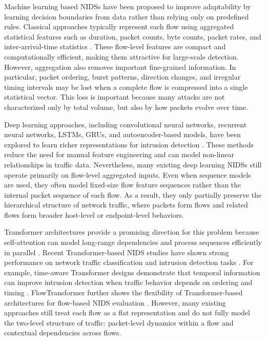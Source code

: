 \documentclass[11pt,fleqn]{report}
\begin{document}
Machine learning based NIDSs have been proposed to improve adaptability by learning decision boundaries from data rather than relying only on predefined rules. Classical approaches typically represent each flow using aggregated statistical features such as duration, packet counts, byte counts, packet rates, and inter-arrival-time statistics \cite{BuczakGuven2016,Ahmed2016Survey}. These flow-level features are compact and computationally efficient, making them attractive for large-scale detection. However, aggregation also removes important fine-grained information. In particular, packet ordering, burst patterns, direction changes, and irregular timing intervals may be lost when a complete flow is compressed into a single statistical vector. This loss is important because many attacks are not characterized only by total volume, but also by how packets evolve over time.

Deep learning approaches, including convolutional neural networks, recurrent neural networks, LSTMs, GRUs, and autoencoder-based models, have been explored to learn richer representations for intrusion detection \cite{Yin2017RNNIDS,Shone2018NNAE,Mirsky2018Kitsune}. These methods reduce the need for manual feature engineering and can model non-linear relationships in traffic data. Nevertheless, many existing deep learning NIDSs still operate primarily on flow-level aggregated inputs. Even when sequence models are used, they often model fixed-size flow feature sequences rather than the internal packet sequence of each flow. As a result, they only partially preserve the hierarchical structure of network traffic, where packets form flows and related flows form broader host-level or endpoint-level behaviors.

Transformer architectures provide a promising direction for this problem because self-attention can model long-range dependencies and process sequences efficiently in parallel \cite{Vaswani2017}. Recent Transformer-based NIDS studies have shown strong performance on network traffic classification and intrusion detection tasks \cite{Wu2022RTIDS,Han2023GTID,Manocchio2024FlowTransformer}. For example, time-aware Transformer designs demonstrate that temporal information can improve intrusion detection when traffic behavior depends on ordering and timing \cite{Han2023GTID}. FlowTransformer further shows the flexibility of Transformer-based architectures for flow-based NIDS evaluation \cite{Manocchio2024FlowTransformer}. However, many existing approaches still treat each flow as a flat representation and do not fully model the two-level structure of traffic: packet-level dynamics within a flow and contextual dependencies across flows.
\end{document}
